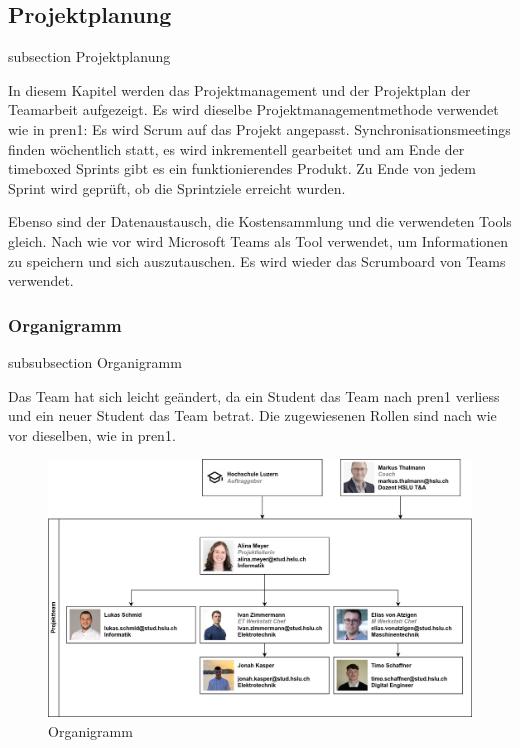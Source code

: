 \subsection*{Projektplanung}
\label{projektplanung}
    {subsection}
    {Projektplanung}

In diesem Kapitel werden das Projektmanagement und der Projektplan der Teamarbeit aufgezeigt.
Es wird dieselbe Projektmanagementmethode verwendet wie in \acrfull{pren1}: Es wird Scrum auf das Projekt angepasst. Synchronisationsmeetings finden wöchentlich statt, es wird inkrementell gearbeitet und am Ende der timeboxed Sprints gibt es ein funktionierendes Produkt. Zu Ende von jedem Sprint wird geprüft, ob die Sprintziele erreicht wurden.\cite{wikipedia-scrum}

Ebenso sind der Datenaustausch, die Kostensammlung und die verwendeten Tools gleich. Nach wie vor wird Microsoft Teams als Tool verwendet, um Informationen zu speichern und sich auszutauschen. Es wird wieder das Scrumboard von Teams verwendet.

\subsubsection*{Organigramm}
    {subsubsection}
    {Organigramm}

Das Team hat sich leicht geändert, da ein Student das Team nach \acrshort{pren1} verliess und ein neuer Student das Team betrat. Die zugewiesenen Rollen sind nach wie vor dieselben, wie in \acrshort{pren1}.

\begin{figure}[H]
\centering
\includegraphics[width=\textwidth]{assets/projektmanagement/Organigramm.png}
\caption{Organigramm}
\label{fig:organigram}
\end{figure}

